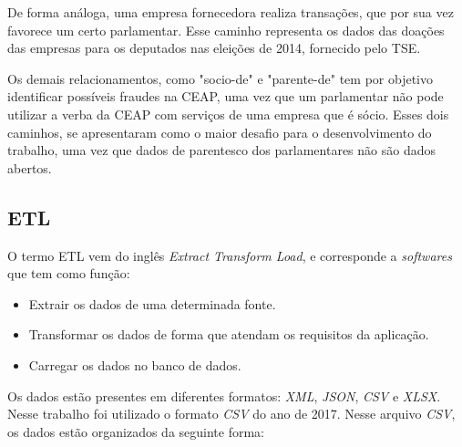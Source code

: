 De forma análoga, uma empresa fornecedora realiza transações, que por sua vez favorece um certo parlamentar. Esse caminho representa os dados das doações das empresas para os deputados nas eleições de 2014, fornecido pelo TSE. 

Os demais relacionamentos, como "socio-de" e "parente-de" tem por objetivo identificar possíveis fraudes na CEAP, uma vez que um parlamentar não pode utilizar a verba da CEAP com serviços de uma empresa que é sócio. Esses dois caminhos, se apresentaram como o maior desafio para o desenvolvimento do trabalho, uma vez que dados de parentesco dos parlamentares não são dados abertos.

\subsection{ETL} \label{etl-subsection}

	O termo ETL vem do inglês \textit{Extract Transform Load}, e corresponde a \textit{softwares} que tem como função:
\begin{itemize}
		\item Extrair os dados de uma determinada fonte.
		\item Transformar os dados de forma que atendam os requisitos da aplicação.
		\item Carregar os dados no banco de dados.
\end{itemize}
	
	Os dados estão presentes em diferentes formatos: \textit{XML}, \textit{JSON}, \textit{CSV} e \textit{XLSX}. Nesse trabalho foi utilizado o formato \textit{CSV} do ano de 2017. Nesse arquivo \textit{CSV}, os dados estão organizados da seguinte forma:

